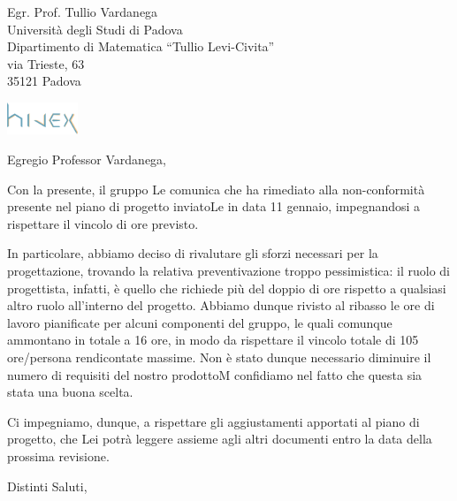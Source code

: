 \documentclass[a4paper]{letter} %
\date{Padova, \today}
\begin{document}
\begin{letter}{Egr. Prof. Tullio Vardanega\\
Università degli Studi di Padova\\
Dipartimento di Matematica “Tullio Levi-Civita”\\
via Trieste, 63\\
35121 Padova}

\includegraphics[width=80px]{../../util/hivex_logo3.png}

\opening{Egregio Professor Vardanega,}

Con la presente, il gruppo \hx{} Le comunica che ha rimediato alla non-conformità presente nel piano di progetto inviatoLe in data 11 gennaio, impegnandosi a rispettare il vincolo di ore previsto.

In particolare, abbiamo deciso di rivalutare gli sforzi necessari per la progettazione, trovando la relativa preventivazione troppo pessimistica: il ruolo di progettista, infatti, è quello che richiede più del doppio di ore rispetto a qualsiasi altro ruolo all'interno del progetto. Abbiamo dunque rivisto al ribasso le ore di lavoro pianificate per alcuni componenti del gruppo, le quali comunque ammontano in totale a 16 ore, in modo da rispettare il vincolo totale di 105 ore/persona rendicontate massime. Non è stato dunque necessario diminuire il numero di requisiti del nostro prodottoM confidiamo nel fatto che questa sia stata una buona scelta.

Ci impegniamo, dunque, a rispettare gli aggiustamenti apportati al piano di progetto, che Lei potrà leggere assieme agli altri documenti entro la data della prossima revisione.

\closing{Distinti Saluti,}

\end{letter}
\end{document}
